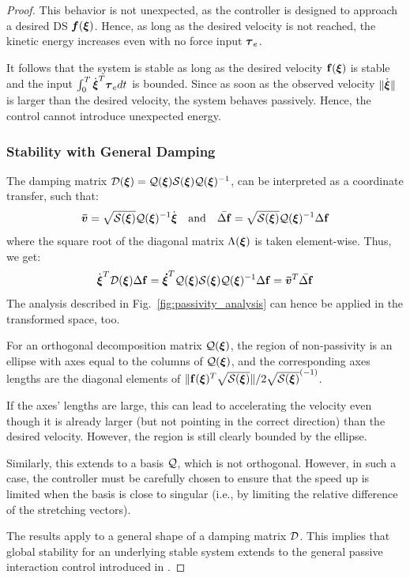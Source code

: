 \begin{proof}
This behavior is not unexpected, as the controller is designed to approach a desired DS $\boldsymbol{f}({\boldsymbol{\xi}})$. Hence, as long as the desired velocity is not reached, the kinetic energy increases even with no force input $\boldsymbol{\tau}_e$.

It follows that the system is stable as long as the desired velocity $\mathbf{f}({\boldsymbol{\xi}})$ is stable and the input $\int_{0}^T \dot{{\boldsymbol{\xi}}}^T \boldsymbol{\tau}_e dt$ is bounded. Since as soon as the observed velocity $\| \dot{{\boldsymbol{\xi}}} \| $ is larger than the desired velocity, the system behaves passively. Hence, the control cannot introduce unexpected energy.

\subsubsection{Stability with General Damping}
The damping matrix $\mathcal{D}({\boldsymbol{\xi}}) = \mathcal{Q}({\boldsymbol{\xi}}) \mathcal{S}({\boldsymbol{\xi}}) \mathcal{Q}({\boldsymbol{\xi}})^{-1}$, can be interpreted as a coordinate transfer, such that:
\begin{equation}
	\boldsymbol{\bar v} = \sqrt{\mathcal{S}({\boldsymbol{\xi}})} \mathcal{Q}({\boldsymbol{\xi}})^{-1} \dot{{\boldsymbol{\xi}}}
	\quad \text{and} \quad
	\bar{\Delta \mathbf f} = \sqrt{\mathcal{S}({\boldsymbol{\xi}})} \mathcal{Q}({\boldsymbol{\xi}})^{-1} \Delta \mathbf{f}
\end{equation}
where the square root of the diagonal matrix $\Lambda({\boldsymbol{\xi}})$ is taken element-wise. Thus, we get:
\begin{equation}
\dot{\boldsymbol{\xi}}^T \mathcal{D}({\boldsymbol{\xi}}) \Delta \mathbf{f} = \boldsymbol{\dot \xi}^T \mathcal{Q}({\boldsymbol{\xi}}) \mathcal{S}({\boldsymbol{\xi}}) \mathcal{Q}({\boldsymbol{\xi}})^{-1} \Delta \mathbf{f} = \boldsymbol{\bar v}^T \bar{\Delta \mathbf f}
\end{equation}
The analysis described in Fig.~\ref{fig:passivity_analysis} can hence be applied in the transformed space, too. 

For an orthogonal decomposition matrix $\mathcal{Q}(\boldsymbol{{\boldsymbol{\xi}}})$, the region of non-passivity is an ellipse with axes equal to the columns of $\mathcal{Q}({\boldsymbol{\xi}})$, and the corresponding axes lengths are the diagonal elements of $\| \mathbf{f}({\boldsymbol{\xi}})^T \sqrt{\mathcal{S}({\boldsymbol{\xi}})}\| / 2 \sqrt{\mathcal{S}({\boldsymbol{\xi}})}^{(-1)}$. 

If the axes' lengths are large, this can lead to accelerating the velocity even though it is already larger (but not pointing in the correct direction) than the desired velocity. However, the region is still clearly bounded by the ellipse.

Similarly, this extends to a basis $\mathcal{Q}$, which is not orthogonal. However, in such a case, the controller must be carefully chosen to ensure that the speed up is limited when the basis is close to singular (i.e., by limiting the relative difference of the stretching vectors).

The results apply to a general shape of a damping matrix $\mathcal{D}$. This implies that global stability for an underlying stable system extends to the general passive interaction control introduced in \cite{kronander2015passive}.
\end{proof}

